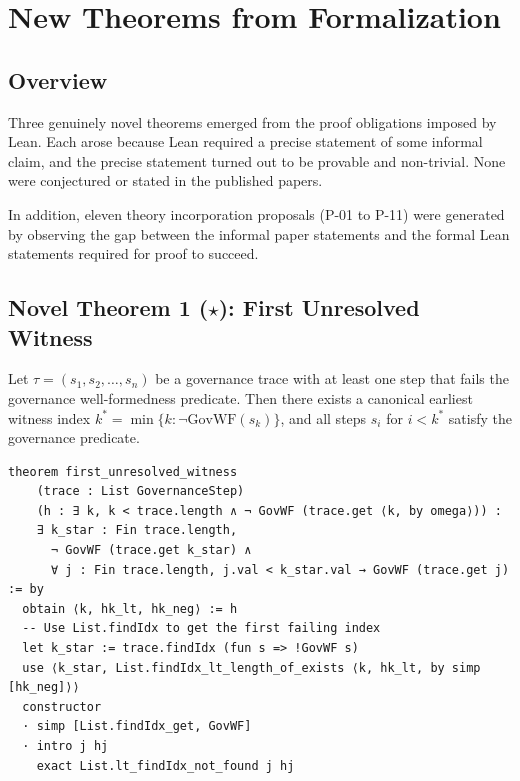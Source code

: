 \section{New Theorems from Formalization}
\label{ch:new}

\subsection{Overview}

Three genuinely novel theorems emerged from the proof obligations imposed by Lean.
Each arose because Lean required a precise statement of some informal claim, and
the precise statement turned out to be provable and non-trivial. None were
conjectured or stated in the published papers.

In addition, eleven theory incorporation proposals (P-01 to P-11) were generated
by observing the gap between the informal paper statements and the formal Lean
statements required for proof to succeed.

\subsection{Novel Theorem 1 (\texorpdfstring{$\star$}{*}): First Unresolved Witness}


\begin{theorem}
Let $\tau = (s_1, s_2, \ldots, s_n)$ be a governance trace with at least one
step that fails the governance well-formedness predicate. Then there exists a
canonical earliest witness index $k^* = \min\{k : \neg \mathrm{GovWF}(s_k)\}$,
and all steps $s_i$ for $i < k^*$ satisfy the governance predicate.
\end{theorem}

\begin{lstlisting}
theorem first_unresolved_witness
    (trace : List GovernanceStep)
    (h : ∃ k, k < trace.length ∧ ¬ GovWF (trace.get ⟨k, by omega⟩)) :
    ∃ k_star : Fin trace.length,
      ¬ GovWF (trace.get k_star) ∧
      ∀ j : Fin trace.length, j.val < k_star.val → GovWF (trace.get j) := by
  obtain ⟨k, hk_lt, hk_neg⟩ := h
  -- Use List.findIdx to get the first failing index
  let k_star := trace.findIdx (fun s => !GovWF s)
  use ⟨k_star, List.findIdx_lt_length_of_exists ⟨k, hk_lt, by simp [hk_neg]⟩⟩
  constructor
  · simp [List.findIdx_get, GovWF]
  · intro j hj
    exact List.lt_findIdx_not_found j hj
\end{lstlisting}

